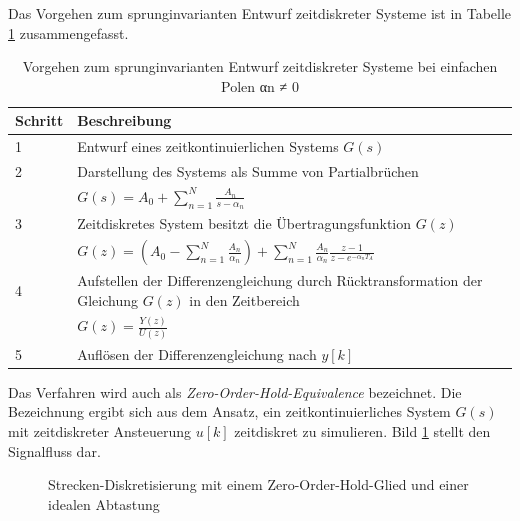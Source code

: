 Das Vorgehen zum sprunginvarianten Entwurf zeitdiskreter Systeme ist in Tabelle \ref{tab:9.2} zusammengefasst.

\begin{table}
  \centering
  \caption{Vorgehen zum sprunginvarianten Entwurf zeitdiskreter Systeme bei einfachen Polen αn ≠ 0}
  \label{tab:9.2}
  \begin{tabular}{ll}
    \toprule
    Schritt & Beschreibung \\
    \midrule
    1 & Entwurf eines zeitkontinuierlichen Systems \(G(s)\) \\
    2 & Darstellung des Systems als Summe von Partialbrüchen \\
    & \(G(s) = A_{0} + \sum\limits_{n = 1}^{N}\frac{A_{n}}{s - \alpha_{n}}\) \\
    3 & Zeitdiskretes System besitzt die Übertragungsfunktion \(G(z)\) \\
    & \(G(z) = \left( A_{0} - \sum\limits_{n = 1}^{N}\frac{A_{n}}{\alpha_{n}} \right) + \sum\limits_{n = 1}^{N}{\frac{A_{n}}{\alpha_{n}}  \frac{z - 1}{z - e^{- \alpha_{n}  T_{A}}}}\) \\
    4 & Aufstellen der Differenzengleichung durch Rücktransformation der Gleichung \(G(z)\) in den Zeitbereich \\
    & \(G(z) = \frac{Y(z)}{U(z)}\) \\
    5 & Auflösen der Differenzengleichung nach \(y[k]\) \\
    \bottomrule
  \end{tabular}
\end{table}

Das Verfahren wird auch als \emph{Zero-Order-Hold-Equivalence} bezeichnet. Die Bezeichnung ergibt sich aus dem Ansatz, ein zeitkontinuierliches System \(G(s)\) mit zeitdiskreter Ansteuerung \(u[k]\) zeitdiskret zu simulieren. Bild \ref{fig:9.5} stellt den Signalfluss dar.

\begin{figure}
  \centering
  
  \caption{Strecken-Diskretisierung mit einem Zero-Order-Hold-Glied und einer idealen Abtastung}
  \label{fig:9.5}
\end{figure}

